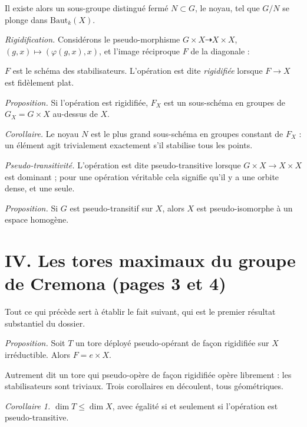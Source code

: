 \documentclass[11pt,a4paper]{article}
\begin{document}
Il existe alors un sous-groupe distingué fermé $N \subset G$, le noyau, tel que
$G/N$ se plonge dans $\mathrm{Baut}_k(X)$.

\emph{Rigidification.} Considérons le pseudo-morphisme $G \times X
\dashrightarrow X \times X$, $(g,x) \mapsto (\varphi(g,x), x)$, et l'image
réciproque $F$ de la diagonale :


$F$ est le schéma des stabilisateurs. L'opération est dite \emph{rigidifiée}
lorsque $F \to X$ est fidèlement plat.

\emph{Proposition.} Si l'opération est rigidifiée, $F_X$ est un sous-schéma en
groupes de $G_X = G \times X$ au-dessus de $X$.

\emph{Corollaire.} Le noyau $N$ est le plus grand sous-schéma en groupes
constant de $F_X$ : un élément agit trivialement exactement s'il stabilise tous
les points.

\emph{Pseudo-transitivité.} L'opération est dite pseudo-transitive lorsque $G
\times X \to X \times X$ est dominant ; pour une opération véritable cela
signifie qu'il y a une orbite dense, et une seule.

\emph{Proposition.} Si $G$ est pseudo-transitif sur $X$, alors $X$ est
pseudo-isomorphe à un espace homogène.

\section*{IV. Les tores maximaux du groupe de Cremona (pages 3 et 4)}

Tout ce qui précède sert à établir le fait suivant, qui est le premier résultat
substantiel du dossier.

\emph{Proposition.} Soit $T$ un tore déployé pseudo-opérant de façon rigidifiée
sur $X$ irréductible. Alors $F = e \times X$.

Autrement dit un tore qui pseudo-opère de façon rigidifiée opère librement :
les stabilisateurs sont triviaux. Trois corollaires en découlent, tous
géométriques.

\emph{Corollaire 1.} $\dim T \leq \dim X$, avec égalité si et seulement si
l'opération est pseudo-transitive.
\end{document}
